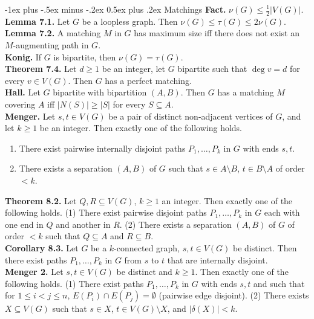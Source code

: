\documentclass[10pt,landscape]{article}
\makeatletter
\renewcommand{\section}{\@startsection{section}{1}{0mm}%
                                {-1ex plus -.5ex minus -.2ex}%
                                {0.5ex plus .2ex}%
                                {\normalfont\large\bfseries}}
\makeatother
\begin{document}
\begin{multicols}{3}
\section{Matchings}
\textbf{Fact.} \( \nu (G) \leq \frac{1}{2} |V(G)|. \) \\
\textbf{Lemma 7.1.} Let \( G \) be a loopless graph. Then \( \nu (G) \leq \tau (G) \leq 2 \nu(G) \). \\
\textbf{Lemma 7.2.} A matching \( M \) in \( G \) has maximum size iff there does not exist an \( M \)-augmenting path in \( G \). \\
\textbf{Konig.} If \( G \) is bipartite, then \( \nu (G) = \tau (G) \). \\
\textbf{Theorem 7.4.} Let \( d \geq 1 \) be an integer, let \( G \) bipartite such that \( \deg v = d \) for every \( v \in  V(G) \). Then \( G \) has a perfect matching. \\
\textbf{Hall.} Let \( G \) bipartite with bipartition \( (A,B) \). Then \( G \) has a matching \( M \) covering \( A \) iff \( |N(S)| \geq |S| \) for every \( S \subseteq A \). \\
\textbf{Menger.} Let \( s,t \in V(G) \) be a pair of distinct non-adjacent vertices of \( G \), and let \( k \geq 1 \) be an integer. Then exactly one of the following holds.
\begin{enumerate}
	\item There exist pairwise internally disjoint paths \( P_1, \hdots , P_k \) in \( G \) with ends \( s,t \).
	\item There exists a separation \( (A,B) \) of \( G \) such that \( s \in A \setminus B \), \( t \in B \setminus A \) of order \( < k \).
\end{enumerate}
\textbf{Theorem 8.2.} Let \( Q, R \subseteq V(G) \), \( k \geq 1 \) an integer. Then exactly one of the following holds. (1) There exist pairwise disjoint paths \( P_1, \hdots , P_k \) in \( G \) each with one end in \( Q \) and another in \( R \). (2) There exists a separation \( (A,B) \) of \( G \) of order \( < k \) such that \( Q \subseteq A \) and \( R \subseteq B \). \\
\textbf{Corollary 8.3.} Let \( G \) be a \( k \)-connected graph, \( s,t \in V(G) \) be distinct. Then there exist paths \( P_1, \hdots , P_k \) in \( G \) from \( s \) to \( t \) that are internally disjoint. \\
\textbf{Menger 2.} Let \( s, t \in V(G) \) be distinct and \( k \geq 1 \). Then exactly one of the following holds. (1) There exist paths \( P_1, \hdots , P_k \) in \( G \) with ends \( s,t \) and such that for \( 1 \leq i < j \leq n \), \( E(P_i) \cap E(P_j) = \emptyset  \) (pairwise edge disjoint). (2) There exists \(  X \subseteq V(G) \) such that \( s \in X \), \( t \in V(G) \setminus X \), and \( |\delta (X)| < k \).

\end{multicols}
\end{document}
